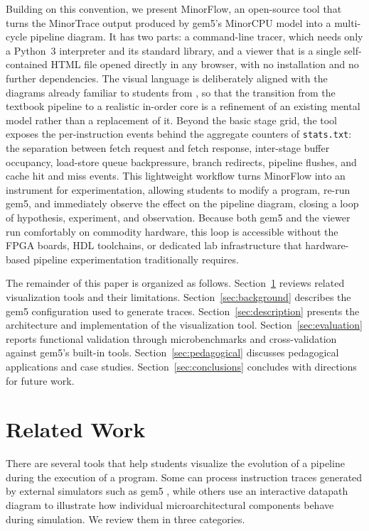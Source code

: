 \documentclass[runningheads,a4paper]{llncs}
\begin{document}
Building on this convention, we present MinorFlow, an open-source tool that turns the MinorTrace output produced by gem5's MinorCPU model into a multi-cycle pipeline diagram. It has two parts: a command-line tracer, which needs only a Python~3 interpreter and its standard library, and a viewer that is a single self-contained HTML file opened directly in any browser, with no installation and no further dependencies. The visual language is deliberately aligned with the diagrams already familiar to students from \cite{patterson2020computer}, so that the transition from the textbook pipeline to a realistic in-order core is a refinement of an existing mental model rather than a replacement of it. Beyond the basic stage grid, the tool exposes the per-instruction events behind the aggregate counters of \texttt{stats.txt}: the separation between fetch request and fetch response, inter-stage buffer occupancy, load-store queue backpressure, branch redirects, pipeline flushes, and cache hit and miss events. This lightweight workflow turns MinorFlow into an instrument for experimentation, allowing students to modify a program, re-run gem5, and immediately observe the effect on the pipeline diagram, closing a loop of hypothesis, experiment, and observation. Because both gem5 and the viewer run comfortably on commodity hardware, this loop is accessible without the FPGA boards, HDL toolchains, or dedicated lab infrastructure that hardware-based pipeline experimentation traditionally requires.

The remainder of this paper is organized as follows. Section~\ref{sec:related} reviews related visualization tools and their limitations. Section~\ref{sec:background} describes the gem5 configuration used to generate traces. Section~\ref{sec:description} presents the architecture and implementation of the visualization tool. Section~\ref{sec:evaluation} reports functional validation through microbenchmarks and cross-validation against gem5’s built-in tools. Section~\ref{sec:pedagogical} discusses pedagogical applications and case studies. Section~\ref{sec:conclusions} concludes with directions for future work.

\section{Related Work}
\label{sec:related}

There are several tools that help students visualize the evolution of a pipeline during the execution of a program. Some can process instruction traces generated by external simulators such as gem5 \cite{binkert2011gem5}, while others use an interactive datapath diagram to illustrate how individual microarchitectural components behave during simulation. We review them in three categories.
\end{document}
